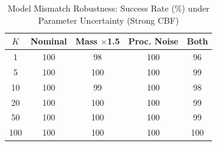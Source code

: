 \begin{table}[htbp]
\centering
\caption{Model Mismatch Robustness: Success Rate (\%) under Parameter Uncertainty (Strong CBF)}
\label{tab:mismatch}
\begin{tabular}{c|cccc}
\toprule
$K$ & Nominal & Mass $\times$1.5 & Proc. Noise & Both \\
\midrule
  1 & 100 & 98 & 100 & 96 \\
  5 & 100 & 100 & 100 & 99 \\
  10 & 100 & 99 & 100 & 98 \\
  20 & 100 & 100 & 100 & 99 \\
  50 & 100 & 100 & 100 & 99 \\
  100 & 100 & 100 & 100 & 100 \\
\bottomrule
\end{tabular}
\end{table}
